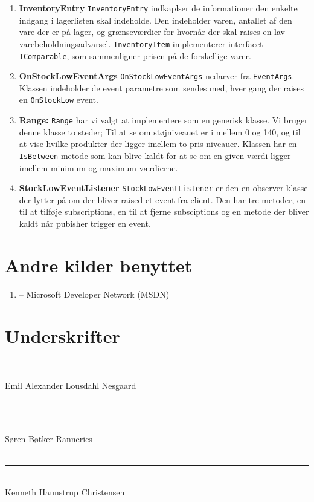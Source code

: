 \documentclass[11pt]{article}
\newcommand{\mono}{\texttt}
\begin{document}
\begin{enumerate}
	\item[] \textbf{InventoryEntry} \mono{InventoryEntry} indkaplser de informationer den enkelte indgang i lagerlisten skal indeholde. Den indeholder varen, antallet af den vare der er på lager, og grænseværdier for hvornår der skal raises en lav-varebeholdningsadvarsel. \mono{InventoryItem} implementerer interfacet \mono{IComparable}, som sammenligner prisen på de forskellige varer.
	
	\item[] \textbf{OnStockLowEventArgs} \mono{OnStockLowEventArgs} nedarver fra \mono{EventArgs}. Klassen indeholder de event parametre som sendes med, hver gang der raises en \mono{OnStockLow} event.
	
	\item[] \textbf{Range:}
	 \mono{Range} har vi valgt at implementere som en generisk klasse. Vi bruger denne klasse to steder; Til at se om støjniveauet er i mellem 0 og 140, og til at vise hvilke produkter der ligger imellem to pris niveauer. Klassen har en \mono{IsBetween} metode som kan blive kaldt for at se om en given værdi ligger imellem minimum og maximum værdierne.
	 
	 \item[] \textbf{StockLowEventListener} \mono{StockLowEventListener} er den en observer klasse der lytter på om der bliver raised et event fra client. Den har tre metoder, en til at tilføje subscriptions, en til at fjerne subsciptions og en metode der bliver kaldt når pubisher trigger en event.
	 
\end{enumerate}

\section{Andre kilder benyttet}
\begin{enumerate}
	\item[] -- Microsoft Developer Network (MSDN)
\end{enumerate}

\section{Underskrifter}
\vspace{2cm}
\rule{9cm}{1pt}\\
\vspace{1.5cm}
Emil Alexander Lousdahl Nesgaard\\\\
\rule{9cm}{1pt}\\
\vspace{1.5cm}
Søren Bøtker Ranneries\\\\
\rule{9cm}{1pt}\\
\vspace{1.5cm}
Kenneth Haunstrup Christensen\\\\
\end{document}

